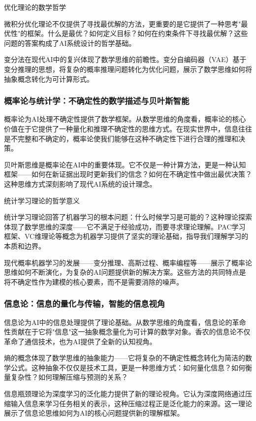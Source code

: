 优化理论的数学哲学

微积分优化理论不仅提供了寻找最优解的方法，更重要的是它提供了一种思考"最优性"的框架。什么是最优？如何定义目标？如何在约束条件下寻找最优解？这些问题的答案构成了AI系统设计的哲学基础。

变分法在现代AI中的复兴体现了数学思维的前瞻性。变分自编码器（VAE）基于变分推理的思想，将复杂的概率推理问题转化为优化问题，展示了数学思维如何将抽象概念转化为可计算形式。

\subsubsection{概率论与统计学：不确定性的数学描述与贝叶斯智能}

概率论为AI处理不确定性提供了数学框架。从数学思维的角度看，概率论的核心价值在于它提供了一种量化和推理不确定性的思维方式。在现实世界中，信息往往是不完整和不确定的，概率论使我们能够在这种不确定性下进行合理的推理和决策。

贝叶斯思维是概率论在AI中的重要体现。它不仅是一种计算方法，更是一种认知框架——如何在新证据出现时更新我们的信念？如何在不确定性中做出最优决策？这种思维方式深刻影响了现代AI系统的设计理念。

统计学习理论的哲学意义

统计学习理论回答了机器学习的根本问题：什么时候学习是可能的？这种理论探索体现了数学思维的深度——它不满足于经验成功，而要寻求理论理解。PAC学习框架、VC维理论等概念为机器学习提供了坚实的理论基础，指导我们理解学习的本质和边界。

现代概率机器学习的发展——变分推理、高斯过程、概率编程等——展示了概率论思维如何不断演化，为复杂的AI问题提供新的解决方案。这些方法的共同特点是将不确定性作为建模的核心要素，而不是需要消除的噪声。

\subsubsection{信息论：信息的量化与传输，智能的信息视角}

信息论为AI中的信息处理提供了理论基础。从数学思维的角度看，信息论的革命性贡献在于它将"信息"这一抽象概念量化为可计算的数学对象。香农的信息论不仅革命了通信技术，也为AI提供了全新的认知视角。

熵的概念体现了数学思维的抽象能力——它将复杂的不确定性概念转化为简洁的数学公式。这种抽象不仅仅是技术工具，更是一种思维方式：如何量化信息？如何衡量复杂性？如何理解压缩与预测的关系？

信息瓶颈理论为深度学习的泛化能力提供了新的理论视角。它认为深度网络通过压缩输入信息来学习任务相关的表示，这种压缩过程正是泛化能力的来源。这一理论展示了信息论思维如何为AI的核心问题提供新的理解框架。

